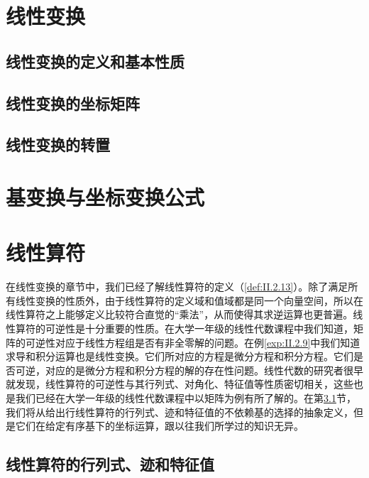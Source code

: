 \documentclass[zihao=-4,linespread=1.5,a4paper,heading=true,twoside]{ctexbook}
\theoremstyle{definition}
\theoremstyle{plain}
\begin{document}
\section{线性变换}\label{sec:II.2.2}
\subsection{线性变换的定义和基本性质}\label{sec:II.2.2.1}


\subsection{线性变换的坐标矩阵}\label{sec:II.2.2.2}


\subsection{线性变换的转置}\label{sec:II.2.2.3}


\section{基变换与坐标变换公式}\label{sec:II.2.3}


\section{线性算符}\label{sec:II.2.4}
在线性变换的章节中，我们已经了解线性算符的定义（\ref{def:II.2.13}）。除了满足所有线性变换的性质外，由于线性算符的定义域和值域都是同一个向量空间，所以在线性算符之上能够定义比较符合直觉的“乘法”，从而使得其求逆运算也更普遍。线性算符的可逆性是十分重要的性质。在大学一年级的线性代数课程中我们知道，矩阵的可逆性对应于线性方程组是否有非全零解的问题。在例\ref{exp:II.2.9}中我们知道求导和积分运算也是线性变换。它们所对应的方程是微分方程和积分方程。它们是否可逆，对应的是微分方程和积分方程的解的存在性问题。线性代数的研究者很早就发现，线性算符的可逆性与其行列式、对角化、特征值等性质密切相关，这些也是我们已经在大学一年级的线性代数课程中以矩阵为例有所了解的。在第\ref{sec:II.2.4.1}节，我们将从给出行线性算符的行列式、迹和特征值的不依赖基的选择的抽象定义，但是它们在给定有序基下的坐标运算，跟以往我们所学过的知识无异。

\subsection{线性算符的行列式、迹和特征值}\label{sec:II.2.4.1}

\end{document}
